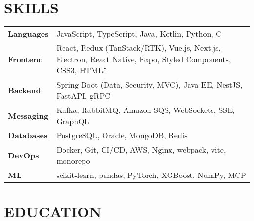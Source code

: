 \documentclass[11pt,a4paper]{moderncv}
\begin{document}
\vspace{-1em}

\section{SKILLS}
{\renewcommand{\arraystretch}{1.05}
\setlength{\tabcolsep}{4pt} %
\begin{tabularx}{\linewidth}{@{}>{\bfseries}l >{}X@{}}
Languages & JavaScript, TypeScript, Java, Kotlin, Python, C \\ [0.25em]
Frontend  & React, Redux (TanStack/RTK), Vue.js, Next.js, Electron, React Native, Expo, Styled Components, CSS3, HTML5 \\ [0.25em]
Backend   & Spring Boot (Data, Security, MVC), Java EE, NestJS, FastAPI, gRPC \\ [0.25em]
Messaging & Kafka, RabbitMQ, Amazon SQS, WebSockets, SSE, GraphQL \\ [0.25em]
Databases & PostgreSQL, Oracle, MongoDB, Redis\\ [0.25em]
DevOps    & Docker, Git, CI/CD, AWS, Nginx, webpack, vite, monorepo \\ [0.25em]
ML & scikit-learn, pandas, PyTorch, XGBoost, NumPy, MCP
\end{tabularx}
}
\section{EDUCATION}
\vspace{0.5em}
\newlength{\EduGap}
\setlength{\EduGap}{4mm} %
\end{document}
